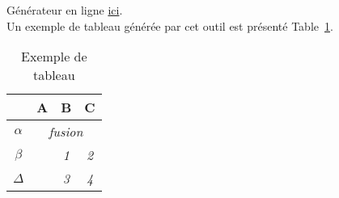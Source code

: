 Générateur en ligne \href{http://www.tablesgenerator.com/latex_tables}{ici}. \\

Un exemple de tableau générée par cet outil est présenté Table~\ref{tableau_exemple}.

\begin{table}[]
\centering
\begin{tabular}{c|c|c|c|}
\cline{2-4}
                               & \textbf{A}                 & \textbf{B} & \textbf{C} \\ \hline
\multicolumn{1}{|c|}{$\alpha$} & \multicolumn{3}{c|}{\textit{fusion}}                 \\ \hline
\multicolumn{1}{|c|}{$\beta$}  & \multirow{2}{*}{\textit{}} & \textit{1} & \textit{2} \\ \cline{1-1} \cline{3-4} 
\multicolumn{1}{|c|}{$\Delta$} &                            & \textit{3} & \textit{4} \\ \hline
\end{tabular}
\caption{Exemple de tableau}
\label{tableau_exemple}
\end{table}
